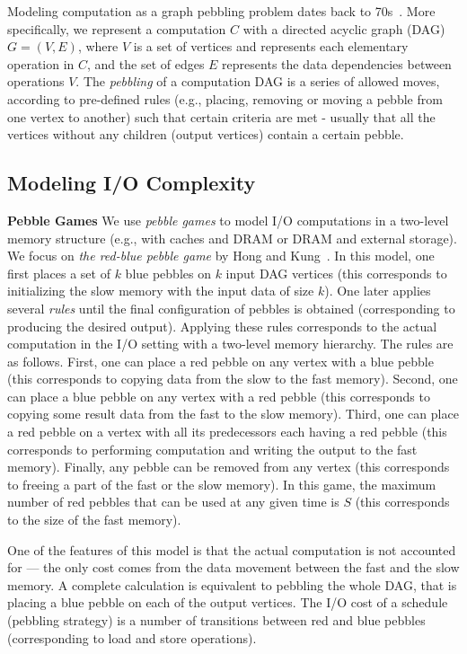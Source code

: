 \documentclass[sigplan,review,anonymous]{acmart}\settopmatter{printfolios=true,printccs=false,printacmref=false}
\newcommand{\macb}[1]{\textbf{\textsf{#1}}}
\begin{document}
Modeling computation as a graph pebbling problem dates back to
70s~\cite{completeRegisterProblems, pebblegameregister, registerpebblecolor}.
More specifically, we represent a computation $C$ with a directed acyclic graph
(DAG) $G=(V,E)$, where $V$ is a set of vertices and represents each
elementary operation in $C$, and the set of edges $E$ represents the data
dependencies between operations $V$. The \textit{pebbling} of a computation DAG
is a series of allowed moves, according to pre-defined rules (e.g., placing, 
removing or
moving a pebble from one vertex to another) such that certain criteria are met
- usually that all the vertices without any children (output vertices) contain
a certain pebble.

\subsection{Modeling I/O Complexity}
\noindent
\macb{Pebble Games}
%
We use \emph{pebble games} to model I/O computations in a two-level memory
structure (e.g., with caches and DRAM or DRAM and external storage).  We focus
on \emph{the red-blue pebble game} by Hong and Kung~\cite{redblue}.
%
In this model, one first places a set of $k$ blue pebbles on $k$ input DAG
vertices (this corresponds to initializing the slow memory with the input data
of size $k$).  One later applies several \emph{rules} until the final
configuration of pebbles is obtained (corresponding to producing the desired
output). Applying these rules corresponds to the actual computation in the I/O
setting with a two-level memory hierarchy.  The rules are as follows. First,
one can place a red pebble on any vertex with a blue pebble (this corresponds
to copying data from the slow to the fast memory).  Second, one can place a
blue pebble on any vertex with a red pebble (this corresponds to copying some
result data from the fast to the slow memory). Third, one can place a red
pebble on a vertex with all its predecessors each having a red pebble (this
corresponds to performing computation and writing the output to the fast
memory).  Finally, any pebble can be removed from any vertex (this corresponds
to freeing a part of the fast or the slow memory).
%
In this game, the maximum number of red pebbles that can be used at any given
time is $S$ (this corresponds to the size of the fast memory).

One of the features of this model is that the actual computation is not
accounted for --- the only cost comes from the data movement between the fast 
and
the slow memory. A complete calculation is equivalent to pebbling the whole
DAG, that is placing a blue pebble on each of the output vertices. The I/O cost
of a schedule (pebbling strategy) is a number of transitions between red and
blue pebbles (corresponding to load and store operations).
\end{document}
